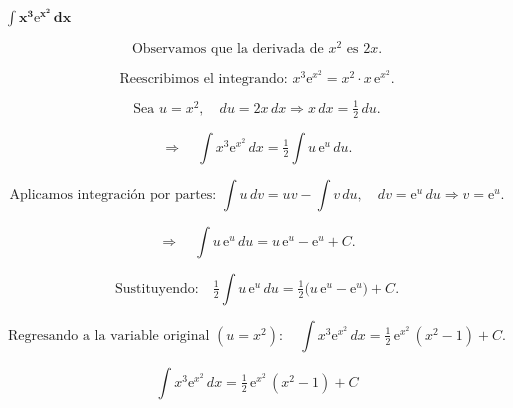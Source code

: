 $\displaystyle \mathbf{\int x^{3}\mathrm{e}^{x^{2}}\,dx}$

\nopagebreak
\[
\text{Observamos que la derivada de } x^{2} \text{ es } 2x.
\]

\[
\text{Reescribimos el integrando: } 
x^{3}\mathrm{e}^{x^{2}} = x^{2}\cdot x\,\mathrm{e}^{x^{2}}.
\]

\[
\text{Sea } u = x^{2}, \quad du = 2x\,dx \Rightarrow x\,dx = \tfrac{1}{2}\,du.
\]

\[
\Rightarrow\quad
\int x^{3}\mathrm{e}^{x^{2}}\,dx 
= \tfrac{1}{2}\int u\,\mathrm{e}^{u}\,du.
\]

\[
\text{Aplicamos integración por partes: } 
\int u\,dv = uv - \int v\,du,
\quad dv = \mathrm{e}^{u}\,du \Rightarrow v = \mathrm{e}^{u}.
\]

\[
\Rightarrow\quad
\int u\,\mathrm{e}^{u}\,du = u\,\mathrm{e}^{u} - \mathrm{e}^{u} + C.
\]

\[
\text{Sustituyendo:}\quad
\tfrac{1}{2}\int u\,\mathrm{e}^{u}\,du
= \tfrac{1}{2}\big(u\,\mathrm{e}^{u} - \mathrm{e}^{u}\big) + C.
\]

\[
\text{Regresando a la variable original } (u = x^{2}):
\quad
\int x^{3}\mathrm{e}^{x^{2}}\,dx
= \tfrac{1}{2}\,\mathrm{e}^{x^{2}}\,(x^{2} - 1) + C.
\]

\[
\boxed{
\displaystyle 
\int x^{3}\mathrm{e}^{x^{2}}\,dx
= \tfrac{1}{2}\,\mathrm{e}^{x^{2}}\,(x^{2} - 1) + C
}
\]
